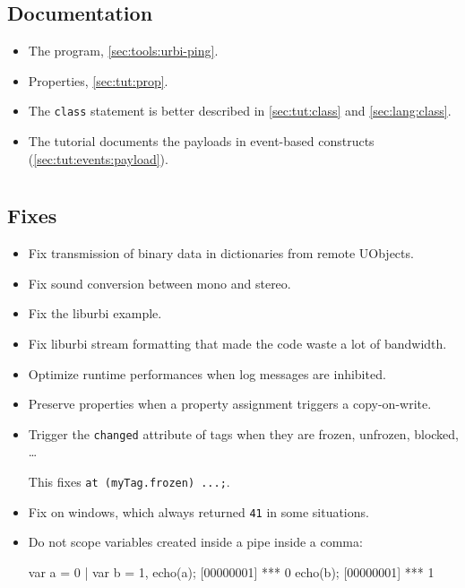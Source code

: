\subsection{Documentation}
\begin{itemize}
\item The  program, \autoref{sec:tools:urbi-ping}.
\item Properties, \autoref{sec:tut:prop}.
\item The \lstinline|class| statement is better described in
  \autoref{sec:tut:class} and \autoref{sec:lang:class}.
\item The tutorial documents the payloads in event-based constructs
  (\autoref{sec:tut:events:payload}).
\end{itemize}


\section{}

\subsection{Fixes}

\begin{itemize}
\item Fix transmission of binary data in dictionaries from remote UObjects.
\item Fix sound conversion between mono and stereo.
\item Fix the  liburbi example.
\item Fix liburbi stream formatting that made the code waste a lot of
  bandwidth.
\item Optimize runtime performances when log messages are inhibited.
\item Preserve properties when a property assignment triggers a copy-on-write.
\item Trigger the \lstinline|changed| attribute of tags when they are
  frozen, unfrozen, blocked, \ldots

  This fixes \lstinline|at (myTag.frozen) ...;|.
\item Fix  on windows, which always returned
  \lstinline|41| in some situations.
\item Do not scope variables created inside a pipe inside a comma:
\begin{urbiscript}
var a = 0 | var b = 1,
echo(a);
[00000001] *** 0
echo(b);
[00000001] *** 1
\end{urbiscript}
\end{itemize}

